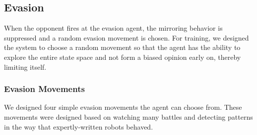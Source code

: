\documentclass{article}
\theoremstyle{plain}
\theoremstyle{definition}
\theoremstyle{remark}
\begin{document}


\subsection*{Evasion}
When the opponent fires at the evasion agent, the mirroring behavior is suppressed and a random evasion movement is chosen. For training, we designed the system to choose a random movement so that the agent has the ability to explore the entire state space and not form a biased opinion early on, thereby limiting itself.

\subsubsection*{Evasion Movements}
We designed four simple evasion movements the agent can choose from. These movements were designed based on watching many battles and detecting patterns in the way that expertly-written robots behaved.
\end{document}
